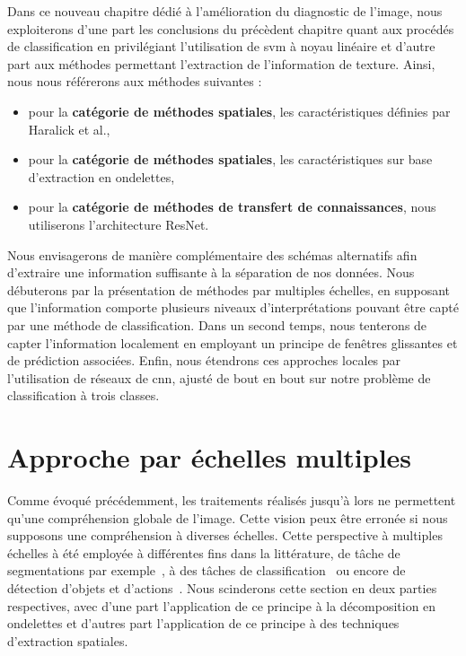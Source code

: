 Dans ce nouveau chapitre dédié à l'amélioration du diagnostic de l'image, nous exploiterons d'une part les conclusions du précèdent chapitre quant aux procédés de classification en privilégiant l'utilisation de \gls{svm} à noyau linéaire et d'autre part aux méthodes permettant l'extraction de l'information de texture. Ainsi, nous nous référerons aux méthodes suivantes :
\begin{itemize}
    \item pour la \textbf{catégorie de méthodes spatiales}, les caractéristiques définies par Haralick et al.,
    \item pour la \textbf{catégorie de méthodes spatiales}, les caractéristiques sur base d'extraction en ondelettes,
    \item pour la \textbf{catégorie de méthodes de transfert de connaissances}, nous utiliserons l'architecture ResNet.
\end{itemize}\par

Nous envisagerons de manière complémentaire des schémas alternatifs afin d'extraire une information suffisante à la séparation de nos données. Nous débuterons par la présentation de méthodes par multiples échelles, en supposant que l'information comporte plusieurs niveaux d'interprétations pouvant être capté par une méthode de classification. Dans un second temps, nous tenterons de capter l'information localement en employant un principe de fenêtres glissantes et de prédiction associées. Enfin, nous étendrons ces approches locales par l'utilisation de réseaux de \gls{cnn}, ajusté de bout en bout sur notre problème de classification à trois classes.\par
\clearpage

\section{Approche par échelles multiples}
Comme évoqué précédemment, les traitements réalisés jusqu'à lors ne permettent qu'une compréhension globale de l'image. Cette vision peux être erronée si nous supposons une compréhension à diverses échelles. Cette perspective à multiples échelles à été employée à différentes fins dans la littérature, de tâche de segmentations par exemple~\cite{Santos2012}, à des tâches de classification~\cite{Alsaih2016} ou encore de détection d'objets et d'actions~\cite{Pedersoli2011}. Nous scinderons cette section en deux parties respectives, avec d'une part l'application de ce principe à la décomposition en ondelettes et d'autres part l'application de ce principe à des techniques d'extraction spatiales.\par 

